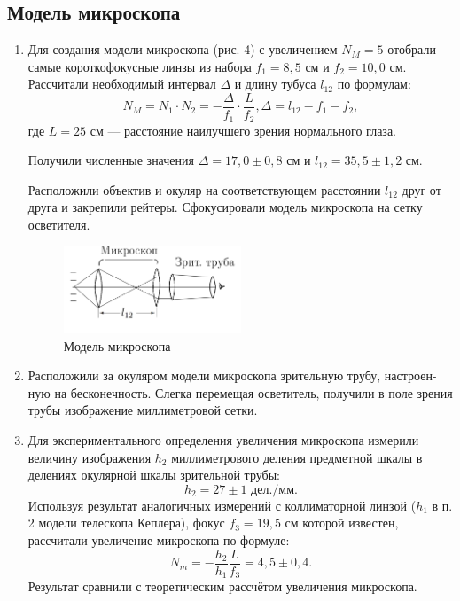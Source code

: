 \documentclass[a4paper,12pt]{article}
\begin{document}
	\subsection*{Модель микроскопа}
	\begin{enumerate}
		\item Для создания модели микроскопа (рис. 4) с увеличением $N_M = 5$ отобрали
		самые короткофокусные линзы из набора $f_1 = 8{,}5$ см и $f_2=10{,}0$ см. Рассчитали необходимый интервал $\Delta$ и длину тубуса $l_{12}$ по формулам:
		\begin{equation*}
		N_M = N_1\cdot N_2 = -\dfrac{\Delta}{f_1}\cdot\dfrac{L}{f_2},
		\Delta=l_{12}-f_1-f_2,
		\end{equation*}
		где $L = 25$ см --- расстояние наилучшего зрения нормального глаза.
		
		Получили численные значения $\Delta = 17{,}0\pm0{,}8$ см и $l_{12} = 35{,}5\pm1{,}2$ см.
		
		Расположили объектив и окуляр на соответствующем расстоянии $l_{12}$ друг от друга и закрепили рейтеры. Сфокусировали модель микроскопа на сетку осветителя. 
		
		\begin{figure}
			\begin{center}
				\includegraphics[width = 0.5\textwidth]{412-4.png}
				\caption{Модель микроскопа}
			\end{center}
		\end{figure}
		\item Расположили за окуляром модели микроскопа зрительную трубу, настроен-
		ную на бесконечность. Слегка перемещая осветитель, получили в поле зрения
		трубы изображение миллиметровой сетки. 
		
		\item Для экспериментального определения увеличения микроскопа измерили величину изображения $h_2$ миллиметрового деления предметной шкалы в делениях окулярной шкалы зрительной трубы:
		\begin{equation*}
		h_2 = 27\pm1\text{ дел./мм}.
		\end{equation*}
		Используя результат аналогичных измерений с коллиматорной линзой ($h_1$ в п. 2 модели телескопа Кеплера), фокус $f_3 = 19{,}5$ см которой известен, рассчитали увеличение микроскопа по формуле:
		\begin{equation*}
		N_m = -\dfrac{h_2}{h_1}\dfrac{L}{f_3} = 4{,}5\pm0{,}4.
		\end{equation*}
		Результат сравнили с теоретическим рассчётом увеличения микроскопа.
	\end{enumerate}
\end{document}
